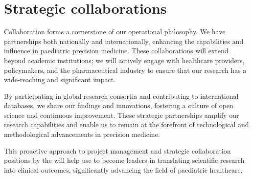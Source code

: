 \section{Strategic collaborations}
Collaboration forms a cornerstone of our operational philosophy. 
We have partnerships both nationally and internationally, enhancing the capabilities and influence in paediatric precision medicine. 
These collaborations will extend beyond academic institutions; we will actively engage with healthcare providers, policymakers, and the pharmaceutical industry to ensure that our research has a wide-reaching and significant impact.

By participating in global research consortia and contributing to international databases, we share our findings and innovations, fostering a culture of open science and continuous improvement. 
These strategic partnerships amplify our research capabilities and enable us to remain at the forefront of technological and methodological advancements in precision medicine.

This proactive approach to project management and strategic collaboration positions by the \pmu will help use to become leaders in translating scientific research into  clinical outcomes, significantly advancing the field of paediatric healthcare.

